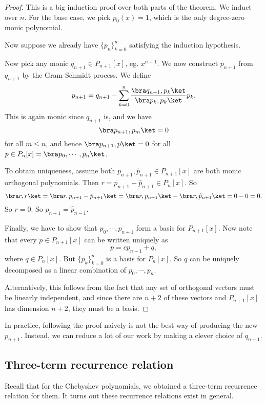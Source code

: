 \documentclass[a4paper]{article}
\begin{document}
\begin{proof}
  This is a big induction proof over both parts of the theorem. We induct over $n$. For the base case, we pick $p_0(x) = 1$, which is the only degree-zero monic polynomial.

  Now suppose we already have $\{p_n\}_{k = 0}^n$ satisfying the induction hypothesis.

  Now pick any monic $q_{n + 1} \in P_{n + 1}[x]$, eg. $x^{n + 1}$. We now construct $p_{n + 1}$ from $q_{n + 1}$ by the Gram-Schmidt process. We define
  \[
    p_{n + 1} = q_{n + 1} - \sum_{k = 0}^n \frac{\bra q_{n + 1}, p_k\ket}{\bra p_k, p_k\ket} p_k.
  \]
  This is again monic since $q_{n + 1}$ is, and we have
  \[
    \bra p_{n + 1}, p_m \ket = 0
  \]
  for all $m \leq n$, and hence $\bra p_{n + 1}, p\ket = 0$ for all $p \in P_n[x] = \bra p_0, \cdots,p_n\ket$.

  To obtain uniqueness, assume both $p_{n + 1}, \hat{p}_{n + 1} \in P_{n + 1}[x]$ are both monic orthogonal polynomials. Then $r = p_{n + 1} - \hat{p}_{n + 1} \in P_n[x]$. So
  \[
    \bra r, r\ket = \bra r, p_{n + 1} - \hat{p}_{n + 1}\ket = \bra r, p_{n + 1}\ket - \bra r, \hat{p}_{n + 1}\ket = 0 - 0 = 0.
  \]
  So $r = 0$. So $p_{n + 1} = \hat{p}_{n - 1}$.

  Finally, we have to show that $p_0, \cdots, p_{n + 1}$ form a basis for $P_{n + 1}[x]$. Now note that every $p \in P_{n + 1}[x]$ can be written uniquely as
  \[
    p = cp_{n + 1} + q,
  \]
  where $q \in P_n[x]$. But $\{p_k\}_{k = 0}^n$ is a basis for $P_n[x]$. So $q$ can be uniquely decomposed as a linear combination of $p_0, \cdots, p_n$.

  Alternatively, this follows from the fact that any set of orthogonal vectors must be linearly independent, and since there are $n + 2$ of these vectors and $P_{n + 1}[x]$ has dimension $n + 2$, they must be a basis.
\end{proof}

In practice, following the proof naively is not the best way of producing the new $p_{n + 1}$. Instead, we can reduce a lot of our work by making a clever choice of $q_{n + 1}$.

\subsection{Three-term recurrence relation}
Recall that for the Chebyshev polynomials, we obtained a three-term recurrence relation for them. It turns out these recurrence relations exist in general.
\end{document}
